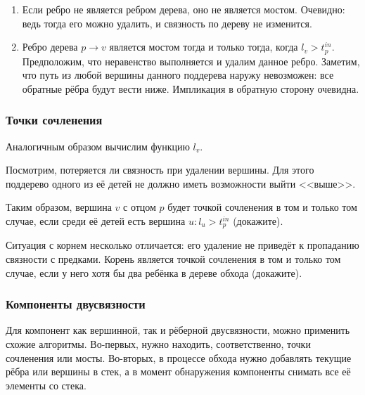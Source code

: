 \documentclass[a4paper,12pt]{article}
\begin{document}
      \begin{enumerate}
        \item Если ребро не является ребром дерева, оно не является
          мостом. Очевидно: ведь тогда его можно удалить, и связность
          по дереву не изменится.
        \item Ребро дерева $p \to v$ является мостом тогда и только
          тогда, когда $l_v > t^{in}_p$. Предположим, что неравенство
          выполняется и удалим данное ребро. Заметим, что путь из
          любой вершины данного поддерева наружу невозможен: все
          обратные рёбра будут вести ниже. Импликация в обратную
          сторону очевидна.
      \end{enumerate}

      \subsubsection{Точки сочленения}

      Аналогичным образом вычислим функцию $l_v$.

      Посмотрим, потеряется ли связность при удалении вершины. Для этого
      поддерево одного из её детей не должно иметь возможности выйти
      <<выше>>.

      Таким образом, вершина $v$ с отцом $p$ будет точкой сочленения
      в том и только том случае, если среди её детей есть вершина
      $u: l_u > t^{in}_p$ (докажите).

      Ситуация с корнем несколько отличается: его удаление не приведёт
      к пропаданию связности с предками. Корень является точкой сочленения
      в том и только том случае, если у него хотя бы два ребёнка в дереве
      обхода (докажите).

      \subsubsection{Компоненты двусвязности}

      Для компонент как вершинной, так и рёберной двусвязности, можно
      применить схожие алгоритмы. Во-первых, нужно находить, соответственно,
      точки сочленения или мосты. Во-вторых, в процессе обхода нужно
      добавлять текущие рёбра или вершины в стек, а в момент обнаружения
      компоненты снимать все её элементы со стека.

\end{document}
